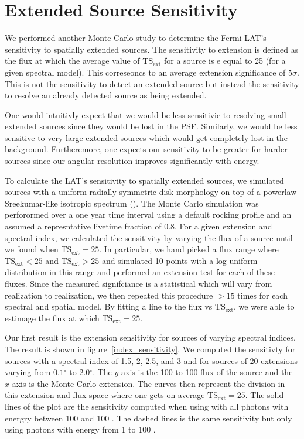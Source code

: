 \documentclass[12pt,preprint]{aastex}
\newcommand{\mev}{\text{MeV}\xspace}
\newcommand{\gev}{\text{GeV}\xspace}
\newcommand{\tsext}{{\ensuremath{\text{TS}_\text{ext}}}\xspace}
\renewcommand{\deg}{\ensuremath{^\circ}\xspace}
\begin{document}
\section{Extended Source Sensitivity}\label{extension_sensitivity}

We performed another Monte Carlo study to determine the Fermi LAT's
sensitivity to spatially extended sources. The sensitivity to extension
is defined as the flux at which 
the average value of $\tsext$ for a source is 
e equal to 25 (for a given spectral model). This correseoncs
to an average extension significance of $5\sigma$.  This is not the
sensitivity to detect an extended source but instead the sensitivity to
resolve an already detected source as being extended.  

One would intuitivly expect that we would be less sensitivie to resolving
small extended sources since they would be lost in the PSF.  Similarly,
we would be less sensitive to very large extended sources which would
get completely lost in the background. Furtheremore, one expects our
sensitivity to be greater for harder sources since our angular resolution
improves significantly with energy.

To calculate the LAT's sensitivity to spatially extended sources,
we simulated sources with a uniform radially symmetric
disk morphology on top of a powerlaw Sreekumar-like isotropic
spectrum (\cite{sreekumar_isotropic}).  The Monte Carlo
simulation was perforormed over a one year time interval using a default
rocking profile and an assumed a represntative livetime fraction of 0.8.
For a given extension and spectral index, we calculated the
sensitivity by varying the flux of a source until we found 
when $\tsext=25$. In particular, we hand picked a flux range
where $\tsext<25$ and $\tsext>25$ and simulated 10 points with
a log uniform distribution in this range and performed an extension
test for each of these fluxes. Since the measured signifciance is
a statistical which will vary from realization to realization,
we then repeated this procedure $>15$ times for each spectral
and spatial model.  By fitting a line to the flux vs $\tsext$, we were
able to estimage the flux at which $\tsext=25$.

Our first result is the extension sensitivity for sources of varying
spectral indices. The result is shown in figure~\ref{index_sensitivity}.
We computed the sensitivty for sources with a spectral index of 1.5,
2, 2.5, and 3 and for sources of 20 extensions varying from $0.1\deg$
to $2.0\deg$. The $y$ axis is the 100 \mev to 100 \gev flux of the
source and the $x$ axis is the Monte Carlo extension. The curves then
represent the division in this extension and flux space where one gets
on average $\tsext=25$.
The solid lines of the plot are the sensitivity computed when using
with all photons with energry between 100 \mev and 100 \gev. The dashed lines is the
same sensitivity but only using photons with energy from 1 \gev to 100 \gev.
\end{document}
